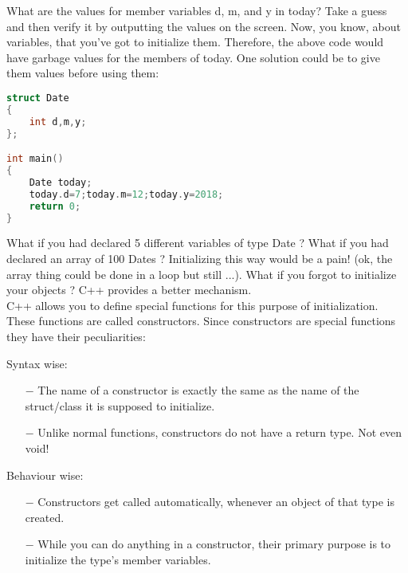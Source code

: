 \documentclass[11pt,fleqn]{book} %
\begin{document}
\noindent What are the values for member variables d, m, and y in today? Take a guess and then verify it by outputting the values on the screen. Now, you know, about variables, that you've got to initialize them. Therefore, the above code would have garbage values for the members of today. One solution could be to give them values before using them:
\begin{lstlisting}[language=C++, caption = Initializing members]
struct Date 
{
	int d,m,y;
};

int main()
{
	Date today; 
	today.d=7;today.m=12;today.y=2018;
	return 0;
}
\end{lstlisting}

\noindent What if you had declared 5 different variables of type Date ? What if you had declared an array of 100 Dates ? Initializing this way would be a pain! (ok, the array thing could be done in a loop but still ...). What if you forgot to initialize your objects ? C++ provides a better mechanism.
\smallskip
~\\

\noindent C++ allows you to define special functions for this purpose of initialization. These functions are called constructors. Since constructors are special functions they have their peculiarities:

\smallskip

\noindent Syntax wise:
\begin{itemize}
	\item [$-$] The name of a constructor is exactly the same as the name of the struct/class it is supposed to initialize.
	\item [$-$] Unlike normal functions, constructors do not have a return type. Not even void!
\end{itemize}

\smallskip

\noindent Behaviour wise:
\begin{itemize}
	\item[$-$] Constructors get called automatically, whenever an object of that type is created.
	\item[$-$] While you can do anything in a constructor, their primary purpose is to initialize the type's member variables.
\end{itemize}
\end{document}
